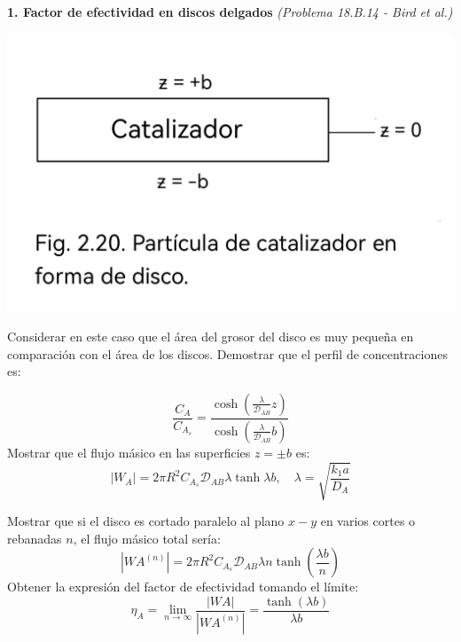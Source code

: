 \textbf{1. Factor de efectividad en discos delgados} \textit{(Problema 18.B.14 - Bird et al.)}
\flushleft
\begin{minipage}{0.4\textwidth} %
    \includegraphics[width=\linewidth]{./Capitulo2/Imagenes/imagen-5.jpg} %
\end{minipage}
\hfill %
\begin{minipage}{0.55\textwidth} %
Considerar en este caso que el área del grosor del disco es muy pequeña en comparación con el área de los discos. Demostrar que el perfil de concentraciones es:
\end{minipage}
\[
 \frac{C_A}{C_{A_s}} = \frac{\cosh \left(\frac{\lambda}{\mathscr{D}_{AB}} z\right)}{\cosh \left(\frac{\lambda}{\mathscr{D}_{AB}} b\right)}
    \]
Mostrar que el flujo másico en las superficies \( z = \pm b \)  es:
\[
    |W_A| = 2 \pi R^2 C_{A_s} \mathscr{D}_{AB} \lambda \tanh \lambda b, \quad \lambda=\sqrt{\frac{k_1a}{D_A}}
\]

Mostrar que si el disco es cortado paralelo al plano \( x-y \) en varios  cortes o rebanadas $n$, el flujo másico total sería:
\[
    |WA^{(n)}| = 2 \pi R^2 C_{A_s} \mathscr{D}_{AB} \lambda n \tanh \left(\frac{\lambda b}{n}\right)
    \]
Obtener la expresión del factor de efectividad tomando el límite:
    \[
    \eta_A = \lim_{n \to \infty} \frac{|WA|}{|WA^{(n)}|} = \frac{\tanh (\lambda b)}{\lambda b}
    \]
    











